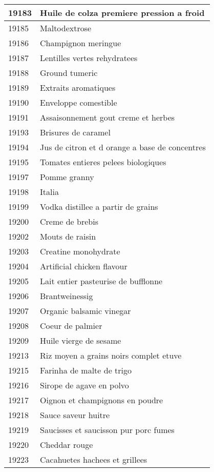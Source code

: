 \begin{longtable}{|l|l|}
19183 & Huile de colza premiere pression a froid \\ \hline 
19185 & Maltodextrose \\ \hline 
19186 & Champignon meringue \\ \hline 
19187 & Lentilles vertes rehydratees \\ \hline 
19188 & Ground tumeric \\ \hline 
19189 & Extraits aromatiques \\ \hline 
19190 & Enveloppe comestible \\ \hline 
19191 & Assaisonnement gout creme et herbes \\ \hline 
19193 & Brisures de caramel \\ \hline 
19194 & Jus de citron et d orange a base de concentres \\ \hline 
19195 & Tomates entieres pelees biologiques \\ \hline 
19197 & Pomme granny \\ \hline 
19198 & Italia \\ \hline 
19199 & Vodka distillee a partir de grains \\ \hline 
19200 & Creme de brebis \\ \hline 
19202 & Mouts de raisin \\ \hline 
19203 & Creatine monohydrate \\ \hline 
19204 & Artificial chicken flavour \\ \hline 
19205 & Lait entier pasteurise de bufflonne \\ \hline 
19206 & Brantweinessig \\ \hline 
19207 & Organic balsamic vinegar \\ \hline 
19208 & Coeur de palmier \\ \hline 
19209 & Huile vierge de sesame \\ \hline 
19213 & Riz moyen a grains noirs complet etuve \\ \hline 
19215 & Farinha de malte de trigo \\ \hline 
19216 & Sirope de agave en polvo \\ \hline 
19217 & Oignon et champignons en poudre \\ \hline 
19218 & Sauce saveur huitre \\ \hline 
19219 & Saucisses et saucisson pur porc fumes \\ \hline 
19220 & Cheddar rouge \\ \hline 
19223 & Cacahuetes hachees et grillees \\ \hline 

\end{longtable}
